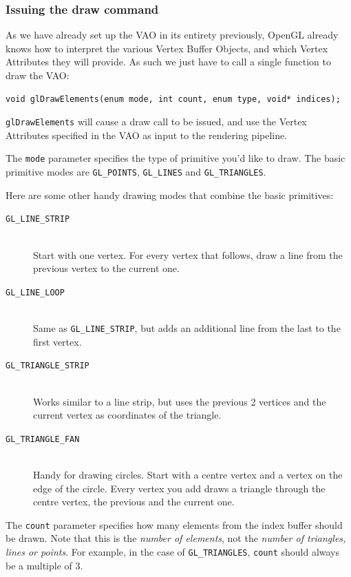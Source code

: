 \subsubsection{Issuing the draw command}

As we have already set up the VAO in its entirety previously, OpenGL already knows how to interpret the various Vertex Buffer Objects, and which Vertex Attributes they will provide. As such we just have to call a single function to draw the VAO:

\begin{verbatim}
void glDrawElements(enum mode, int count, enum type, void* indices);
\end{verbatim}

\texttt{glDrawElements} will cause a draw call to be issued, and use the Vertex Attributes specified in the VAO as input to the rendering pipeline. 

The \texttt{mode} parameter specifies the type of primitive you'd like to draw. The basic primitive modes are \texttt{GL_POINTS}, \texttt{GL_LINES} and \texttt{GL_TRIANGLES}.

Here are some other handy drawing modes that combine the basic primitives:
\begin{description}
\item[\texttt{GL_LINE_STRIP}] \hfill \\
		Start with one vertex. For every vertex that follows, draw a line from the previous vertex to the current one.
\item[\texttt{GL_LINE_LOOP}] \hfill \\
		Same as \texttt{GL_LINE_STRIP}, but adds an additional line from the last to the first vertex.
\item[\texttt{GL_TRIANGLE_STRIP}] \hfill \\
		Works similar to a line strip, but uses the previous 2 vertices and the current vertex as coordinates of the triangle. 
\item[\texttt{GL_TRIANGLE_FAN}] \hfill \\
		Handy for drawing circles. Start with a centre vertex and a vertex on the edge of the circle. Every vertex you add draws a triangle through the centre vertex, the previous and the current one.
\end{description}

The \texttt{count} parameter specifies how many elements from the index buffer should be drawn. Note that this is the \emph{number of elements}, not the \emph{number of triangles, lines or points}. For example, in the case of \texttt{GL_TRIANGLES}, \texttt{count} should always be a multiple of 3.

